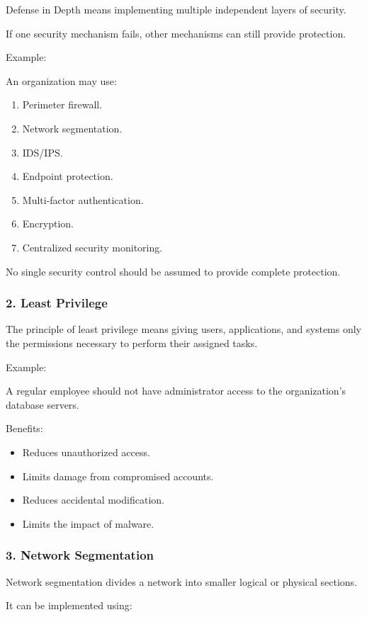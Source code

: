 Defense in Depth means implementing multiple independent layers of security.

If one security mechanism fails, other mechanisms can still provide protection.

Example:

An organization may use:

\begin{enumerate}
\item Perimeter firewall.
\item Network segmentation.
\item IDS/IPS.
\item Endpoint protection.
\item Multi-factor authentication.
\item Encryption.
\item Centralized security monitoring.
\end{enumerate}

No single security control should be assumed to provide complete protection.

\subsubsection{2. Least Privilege}

The principle of least privilege means giving users, applications, and systems only the permissions necessary to perform their assigned tasks.

Example:

A regular employee should not have administrator access to the organization's database servers.

Benefits:

\begin{itemize}
\item Reduces unauthorized access.
\item Limits damage from compromised accounts.
\item Reduces accidental modification.
\item Limits the impact of malware.
\end{itemize}

\subsubsection{3. Network Segmentation}

Network segmentation divides a network into smaller logical or physical sections.

It can be implemented using:

